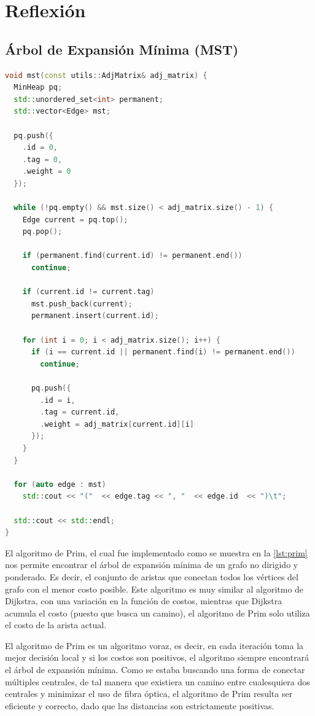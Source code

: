 \documentclass[12pt]{article}
\begin{document}
  \section{Reflexión}
  \subsection{Árbol de Expansión Mínima (MST)}

  \begin{lstlisting}[language=cpp, caption={Algoritmo de Prim}, label={lst:prim}]
void mst(const utils::AdjMatrix& adj_matrix) {
  MinHeap pq;
  std::unordered_set<int> permanent;
  std::vector<Edge> mst;

  pq.push({
    .id = 0,
    .tag = 0,
    .weight = 0
  });

  while (!pq.empty() && mst.size() < adj_matrix.size() - 1) {
    Edge current = pq.top();
    pq.pop();

    if (permanent.find(current.id) != permanent.end())
      continue;

    if (current.id != current.tag)
      mst.push_back(current);
      permanent.insert(current.id);

    for (int i = 0; i < adj_matrix.size(); i++) {
      if (i == current.id || permanent.find(i) != permanent.end())
        continue;

      pq.push({
        .id = i,
        .tag = current.id,
        .weight = adj_matrix[current.id][i]
      });
    }
  }

  for (auto edge : mst)
    std::cout << "("  << edge.tag << ", "  << edge.id  << ")\t";

  std::cout << std::endl;
}
  \end{lstlisting}

  El algoritmo de Prim, el cual fue implementado como se muestra en la \autoref{lst:prim}
  nos permite encontrar el árbol de expansión mínima de un grafo no dirigido y ponderado.
  Es decir, el conjunto de aristas que conectan todos los vértices del grafo con el menor
  costo posible. Este algoritmo es muy similar al algoritmo de Dijkstra, con una variación 
  en la función de costos, mientras que Dijkstra acumula el costo (puesto que busca un camino),
  el algoritmo de Prim solo utiliza el costo de la arista actual.
  
  El algoritmo de Prim es un algoritmo voraz, es decir, en cada iteración toma la mejor decisión
  local y si los costos son positivos, el algoritmo siempre encontrará el árbol de expansión mínima.
  Como se estaba buscando una forma de conectar múltiples centrales, de tal manera que existiera un camino
  entre cualesquiera dos centrales y minimizar el uso de fibra óptica, el algoritmo de Prim resulta ser
  eficiente y correcto, dado que las distancias son estrictamente positivas.
\end{document}
